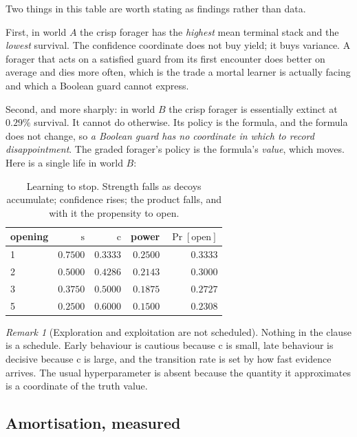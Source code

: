\documentclass[11pt,a4paper]{article}
\theoremstyle{plain}
\theoremstyle{definition}
\theoremstyle{remark}
\newtheorem{remark}[theorem]{Remark}
\newcommand{\str}{\mathrm{s}}
\newcommand{\conf}{\mathrm{c}}
\begin{document}
Two things in this table are worth stating as findings rather than data.

First, in world $A$ the crisp forager has the \emph{highest} mean terminal stack
and the \emph{lowest} survival. The confidence coordinate does not buy yield; it
buys variance. A forager that acts on a satisfied guard from its first encounter
does better on average and dies more often, which is the trade a mortal learner
is actually facing and which a Boolean guard cannot express.

Second, and more sharply: in world $B$ the crisp forager is essentially extinct
at $0.29\%$ survival. It cannot do otherwise. Its policy is the formula, and the
formula does not change, so \emph{a Boolean guard has no coordinate in which to
record disappointment}. The graded forager's policy is the formula's
\emph{value}, which moves. Here is a single life in world $B$:

\begin{table}[h]
\centering
\small
\begin{tabular}{@{}lrrrr@{}}
\toprule
opening & $\str$ & $\conf$ & power & $\Pr[\text{open}]$ \\
\midrule
1 & $0.7500$ & $0.3333$ & $0.2500$ & $0.3333$ \\
2 & $0.5000$ & $0.4286$ & $0.2143$ & $0.3000$ \\
3 & $0.3750$ & $0.5000$ & $0.1875$ & $0.2727$ \\
5 & $0.2500$ & $0.6000$ & $0.1500$ & $0.2308$ \\
\bottomrule
\end{tabular}
\caption{Learning to stop. Strength falls as decoys accumulate; confidence
rises; the product falls, and with it the propensity to open.}\label{tab:trace}
\end{table}

\begin{remark}[Exploration and exploitation are not scheduled]
\label{rem:explore}
Nothing in the clause is a schedule. Early behaviour is cautious because $\conf$
is small, late behaviour is decisive because $\conf$ is large, and the transition
rate is set by how fast evidence arrives. The usual hyperparameter is absent
because the quantity it approximates is a coordinate of the truth value.
\end{remark}

\subsection{Amortisation, measured}
\end{document}
